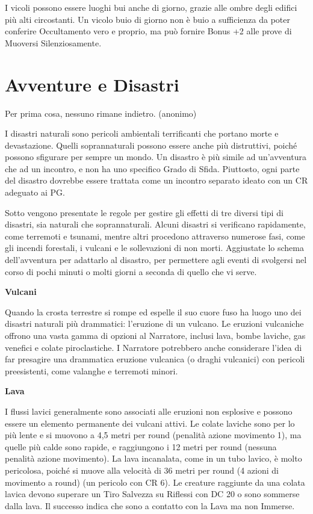 \documentclass[a4paper,11pt,twoside,openany]{book}
\begin{document}
I vicoli possono essere luoghi bui anche di giorno, grazie alle ombre degli edifici più alti circostanti. Un vicolo buio di giorno non è buio a sufficienza da poter conferire Occultamento vero e proprio, ma può fornire Bonus +2 alle prove di Muoversi Silenziosamente.

\pagebreak

\section{Avventure e Disastri}

\label{avventure-e-disastri}
\begin{tcolorbox}[enhanced,arc=5pt,boxrule=0.3pt]{Per prima cosa, nessuno rimane indietro. (anonimo)}\end{tcolorbox}\medskip
I disastri naturali sono pericoli ambientali terrificanti che portano morte e devastazione. Quelli soprannaturali posso­no essere anche più distruttivi, poiché possono sfigurare per sempre un mondo. Un disastro è più simile ad un'avventura che ad un incontro, e non ha uno specifico Grado di Sfida. Piuttosto, ogni parte del disastro dovrebbe essere trattata come un incontro separato ideato con un CR adeguato ai PG.

Sotto vengono presentate le regole per gestire gli effetti di tre diversi tipi di disastri, sia naturali che soprannaturali. Alcuni disastri si verificano rapidamente, come terremoti e tsunami, mentre altri procedono attraverso numerose fasi, come gli incendi forestali, i vulcani e le sollevazioni di non morti. Aggiustate lo schema dell'avventura per adattarlo al disastro, per permettere agli eventi di svolgersi nel corso di pochi minuti o molti giorni a seconda di quello che vi serve.

\textbf{Vulcani}

Quando la crosta terrestre si rompe ed espelle il suo cuore fuso ha luogo uno dei disastri naturali più drammatici: l'eruzione di un vulcano. Le eruzioni vulcaniche offrono una vasta gamma di opzioni al Narratore, inclusi lava, bombe laviche, gas venefici e colate piroclastiche. I Narratore potrebbero anche considerare l'idea di far presagire una drammatica eruzione vulcanica (o draghi vulcanici) con pericoli preesistenti, come valanghe e terremoti minori.

\textbf{Lava}

I flussi lavici generalmente sono associati alle eruzioni non esplosive e possono essere un elemento permanente dei vulcani attivi. Le colate laviche sono per lo più lente e si muovono a 4,5 metri per round (penalità azione movimento 1), ma quelle più calde sono rapide, e raggiungono i 12 metri per round (nessuna penalità azione movimento). La lava incanalata, come in un tubo lavico, è molto pericolosa, poiché si muove alla velocità di 36 metri per round (4 azioni di movimento a round) (un pericolo con CR 6). Le creature raggiunte da una colata lavica devono superare un Tiro Salvezza su Riflessi con DC 20 o sono sommerse dalla lava. Il successo indica che sono a contatto con la Lava ma non Immerse.
\end{document}
